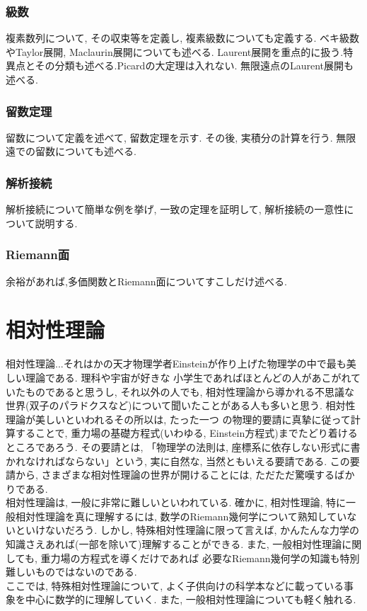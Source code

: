 \documentclass[a4j,dvipdfmx]{jsarticle}
\numberwithin{equation}{section}
\begin{document}
    \section{級数}
        複素数列について, その収束等を定義し, 複素級数についても定義する. ベキ級数やTaylor展開, Maclaurin展開についても述べる.
        Laurent展開を重点的に扱う.特異点とその分類も述べる.Picardの大定理は入れない. 無限遠点のLaurent展開も述べる.
    \clearpage
    \section{留数定理}
        留数について定義を述べて, 留数定理を示す. その後, 実積分の計算を行う. 無限遠での留数についても述べる.
    \clearpage
    \section{解析接続}
        解析接続について簡単な例を挙げ, 一致の定理を証明して, 解析接続の一意性について説明する.
    \clearpage
    \section{Riemann面}
        余裕があれば,多価関数とRiemann面についてすこしだけ述べる.
    \clearpage

    \part{相対性理論}
    \begin{screen}
        相対性理論...それはかの天才物理学者Einsteinが作り上げた物理学の中で最も美しい理論である. 理科や宇宙が好きな
        小学生であればほとんどの人があこがれていたものであると思うし, それ以外の人でも, 相対性理論から導かれる不思議な
        世界(双子のパラドクスなど)について聞いたことがある人も多いと思う. 相対性理論が美しいといわれるその所以は, たった一つ
        の物理的要請に真摯に従って計算することで, 重力場の基礎方程式(いわゆる, Einstein方程式)までたどり着けるところであろう. 
        その要請とは, 「物理学の法則は, 座標系に依存しない形式に書かれなければならない」という, 実に自然な, 当然ともいえる要請である.
        この要請から, さまざまな相対性理論の世界が開けることには, ただただ驚嘆するばかりである.\\
        相対性理論は, 一般に非常に難しいといわれている. 確かに, 相対性理論, 特に一般相対性理論を真に理解するには, 数学のRiemann幾何学について熟知していないといけないだろう.
        しかし, 特殊相対性理論に限って言えば, かんたんな力学の知識さえあれば(一部を除いて)理解することができる. また, 一般相対性理論に関しても, 重力場の方程式を導くだけであれば
        必要なRiemann幾何学の知識も特別難しいものではないのである.\\
        ここでは, 特殊相対性理論について, よく子供向けの科学本などに載っている事象を中心に数学的に理解していく.
        また, 一般相対性理論についても軽く触れる.
    \end{screen}
    \clearpage
\end{document}
